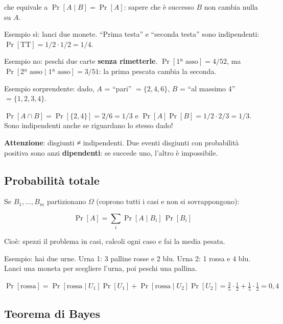 che equivale a \(\Pr[A \mid B] = \Pr[A]\): sapere che è successo \(B\) non cambia nulla su \(A\).

\begin{esempio}

Esempio sì: lanci due monete. ``Prima testa'' e ``seconda testa'' sono indipendenti: \(\Pr[\text{TT}] = 1/2 \cdot 1/2 = 1/4\).

Esempio no: peschi due carte \textbf{senza rimetterle}. \(\Pr[\text{1ª asso}] = 4/52\), ma \(\Pr[\text{2ª asso} \mid \text{1ª asso}] = 3/51\): la prima pescata cambia la seconda.

Esempio sorprendente: dado, \(A\) = ``pari'' \(= \{2,4,6\}\), \(B\) = ``al massimo 4'' \(= \{1,2,3,4\}\).

\(\Pr[A \cap B] = \Pr[\{2,4\}] = 2/6 = 1/3\) e \(\Pr[A]\Pr[B] = 1/2 \cdot 2/3 = 1/3\). Sono indipendenti anche se riguardano lo stesso dado!

\end{esempio}

\textbf{Attenzione}: disgiunti ≠ indipendenti. Due eventi disgiunti con probabilità positiva sono anzi \textbf{dipendenti}: se succede uno, l'altro è impossibile.

\subsection{Probabilità totale}

Se \(B_1, \dots, B_m\) partizionano \(\Omega\) (coprono tutti i casi e non si sovrappongono):

\[
\Pr[A] = \sum_{i} \Pr[A \mid B_i]\,\Pr[B_i]
\]

Cioè: spezzi il problema in casi, calcoli ogni caso e fai la media pesata.

\begin{esempio}

Esempio: hai due urne. Urna 1: 3 palline rosse e 2 blu. Urna 2: 1 rossa e 4 blu. Lanci una moneta per scegliere l'urna, poi peschi una pallina.

\(\Pr[\text{rossa}] = \Pr[\text{rossa} \mid U_1]\Pr[U_1] + \Pr[\text{rossa} \mid U_2]\Pr[U_2] = \tfrac{3}{5}\cdot\tfrac{1}{2} + \tfrac{1}{5}\cdot\tfrac{1}{2} = 0{,}4\)

\end{esempio}

\subsection{Teorema di Bayes}

